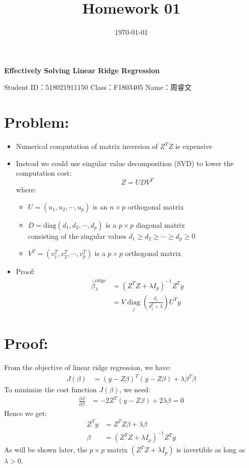 \documentclass[12pt]{article}
\title{Homework 01}
\date{\today}
\begin{document}
	\linespread{0.6} %
	\setlength{\parskip}{0.3\baselineskip}
	\begin{center}
		\LARGE{\textbf{Effectively Solving Linear Ridge Regression}}
		
		\small{Student ID：518021911150 \text{} \text{}  \text{} \text{} Class：F1803405 \text{} \text{} \text{} \text{} Name：周睿文}
	\end{center}
	\section*{Problem:}
	\begin{itemize}
		\item Numerical computation of matrix inversion of $Z^T Z$ is expensive
		\item Instead we could use singular value decomposition (SVD) to lower the computation cost:
		\[ Z = UDV^T \]
		where:
		\begin{itemize}
			\item $U = (u_1, u_2, \cdots, u_p)$ is an $n\times p$ orthogonal matrix
			\item $D = \text{diag}(d_1, d_2, \cdots, d_p)$ is a $p\times p$ diagonal matrix \\
			consisting of the singular values $d_1 \geq d_2 \geq \cdots \geq d_p \geq 0$
			\item $V^T = (v_1^T, v_2^T, \cdots, v_p^T)$ is a $p\times p$ orthogonal matrix
		\end{itemize}
		\item Proof:
		\begin{align*}
		\hat{\beta}_\lambda^{\text{ridge}} &= \left(Z^T Z + \lambda I_p\right)^{-1}Z^T y \\
		&= V \mathop{\text{diag}}\limits_j\left(\frac{d_j}{d_j^2 + \lambda}\right)U^T y
		\end{align*}
	\end{itemize}
	
	\section*{Proof:}
	From the objective of linear ridge regression, we have:
	\begin{align*}
		J\left(\beta\right) &= \left(y-Z\beta\right)^T\left(y-Z\beta\right) + \lambda \beta^T\beta
	\end{align*}
	To minimize the cost function $J\left(\beta\right)$, we need:
	\begin{align*}
		\frac{\partial J}{\partial \beta} &= -2Z^T\left(y-Z\beta\right) + 2\lambda\beta = 0
	\end{align*}
	Hence we get:
	\begin{align*}
		Z^T y &= Z^T Z\beta + \lambda\beta \\
		\beta &= \left(Z^T Z + \lambda I_p\right)^{-1}Z^T y
	\end{align*}
	As will be shown later, the $p \times p$ matrix $\left(Z^T Z + \lambda I_p\right)$ is invertible as long as $\lambda > 0$.
	
\end{document}

